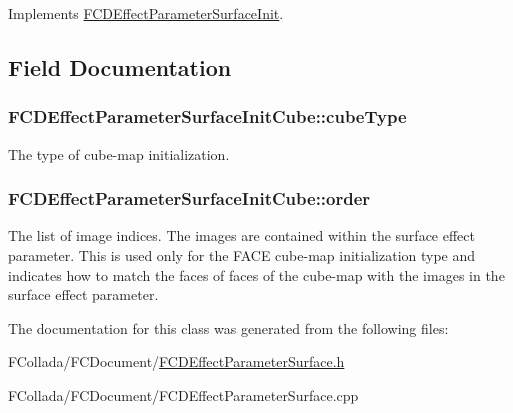 Implements \hyperlink{classFCDEffectParameterSurfaceInit_ad0109233e63c892e5963a3ca67f7108f}{FCDEffectParameterSurfaceInit}.



\subsection{Field Documentation}
\hypertarget{classFCDEffectParameterSurfaceInitCube_af13376d1509627b73843e631db0abffb}{
\subsubsection[{cubeType}]{ {\bf FCDEffectParameterSurfaceInitCube::cubeType}}}
\label{classFCDEffectParameterSurfaceInitCube_af13376d1509627b73843e631db0abffb}
The type of cube-\/map initialization. \hypertarget{classFCDEffectParameterSurfaceInitCube_abb0a85514c43581c62d9b1167d329035}{
\subsubsection[{order}]{ {\bf FCDEffectParameterSurfaceInitCube::order}}}
\label{classFCDEffectParameterSurfaceInitCube_abb0a85514c43581c62d9b1167d329035}
The list of image indices. The images are contained within the surface effect parameter. This is used only for the FACE cube-\/map initialization type and indicates how to match the faces of faces of the cube-\/map with the images in the surface effect parameter. 

The documentation for this class was generated from the following files:\begin{DoxyCompactItemize}
\item 
FCollada/FCDocument/\hyperlink{FCDEffectParameterSurface_8h}{FCDEffectParameterSurface.h}\item 
FCollada/FCDocument/FCDEffectParameterSurface.cpp\end{DoxyCompactItemize}
